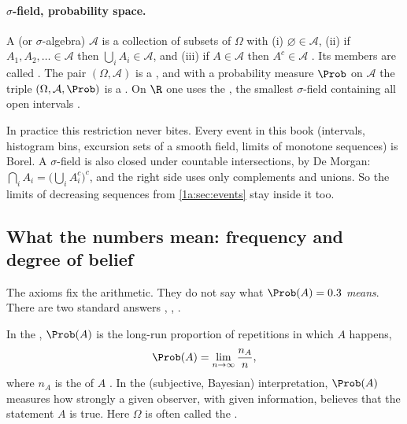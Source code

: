 \paragraph{$\sigma$-field, probability space.}
A  (or $\sigma$-algebra) $\mathcal A$ is a collection
of subsets of $\Omega$ with (i) $\varnothing\in\mathcal A$, (ii) if
$A_1,A_2,\dots\in\mathcal A$ then $\bigcup_iA_i\in\mathcal A$, and (iii) if
$A\in\mathcal A$ then $A^c\in\mathcal A$ . Its members are called . The pair
$(\Omega,\mathcal A)$ is a , and with a probability
measure $\Prob$ on $\mathcal A$ the triple $(\Omega,\mathcal A,\Prob)$ is a
. On $\R$ one uses the , the smallest $\sigma$-field containing all open intervals
.

In practice this restriction never bites. Every event in this book
(intervals, histogram bins, excursion sets of a smooth field, limits of
monotone sequences) is Borel. A $\sigma$-field is also closed under countable
intersections, by De Morgan: $\bigcap_iA_i=\bigl(\bigcup_iA_i^c\bigr)^c$, and
the right side uses only complements and unions. So the limits of decreasing
sequences from \cref{1a:sec:events} stay inside it too.

\subsection{What the numbers mean: frequency and degree of belief}

The axioms fix the arithmetic. They do not say what $\Prob(A)=0.3$
\emph{means}. There are two standard answers ,
, .

\begin{workdef}
In the , $\Prob(A)$ is the long-run proportion
of repetitions in which $A$ happens,
\begin{equation}
\Prob(A)=\lim_{n\to\infty}\frac{n_A}{n},
\label{1a:eq:freq}
\end{equation}
where $n_A$ is the  of $A$ .
In the  (subjective, Bayesian) interpretation,
$\Prob(A)$ measures how strongly a given observer, with given information,
believes that the statement $A$ is true. Here $\Omega$ is often called the
 .
\end{workdef}


